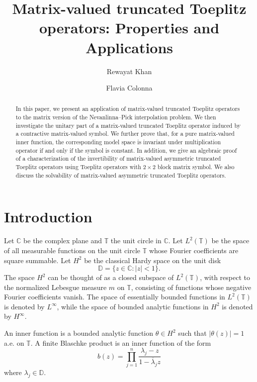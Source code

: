 \documentclass{amsart}
\title[Matrix-valued truncated Toeplitz operators]{Matrix-valued truncated Toeplitz operators: Properties and Applications}
\author{Rewayat Khan}
\author{Flavia Colonna}
\theoremstyle{definition}
\begin{document}
%
\maketitle
%

\begin{abstract}
In this paper, we present an application of matrix-valued truncated
Toeplitz operators to the matrix version of the Nevanlinna–Pick interpolation problem. We then investigate the unitary part of a matrix-valued truncated Toeplitz operator induced by a contractive matrix-valued symbol. 
We further prove that, for a pure matrix-valued inner function, the corresponding model space is invariant under multiplication operator if and only if the symbol is constant.
 In addition, we give an algebraic proof of a characterization of  the invertibility of matrix-valued asymmetric truncated Toeplitz operators using Toeplitz operators with $2\times 2$ block matrix symbol. We also discuss the solvability of matrix-valued asymmetric truncated Toeplitz operators. %
%
\end{abstract}
\medskip


\section{\bf{Introduction}}\label{intro}
 Let $\mathbb{C}$ be the complex plane and $\mathbb{T}$ the unit circle in $\mathbb{C}$. Let $L^{2}(\mathbb{T})$ be the space of all measurable functions on the unit circle $\mathbb{T}$ whose Fourier coefficients are square summable.
Let $H^2$ be the classical Hardy space on the unit disk 
$$\mathbb{D}=\{z\in\mathbb{C}:|z|<1\}.$$ The space $H^{2}$ can be thought of as a closed subspace of $L^{2}(\mathbb{T})$, with respect to the normalized Lebesgue measure $m$ on $\mathbb{T}$, consisting of functions whose negative Fourier coefficients vanish. %
 The space of essentially bounded functions in $L^2({\mathbb{T}})$ is denoted by $L^{\infty}$, while the space of bounded analytic functions in $H^2$ is denoted by $H^{\infty}$.

An inner function is a bounded analytic function $\theta\in H^{2}$ such that $|\theta(z)|=1$ a.e. on $\mathbb{T}$. A finite Blaschke product is an inner function of the form
$$b(z)=\prod_{j=1}^{n}\frac{\lambda_{j}-z}{1-\overline{\lambda}_{j}z}$$
where $\lambda_{j}\in \mathbb{D}$.
\end{document}
